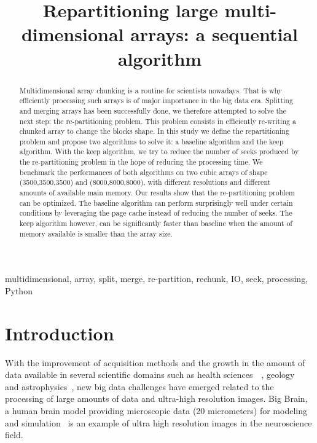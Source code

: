 \documentclass[conference]{IEEEtran}
\begin{document}
\title{Repartitioning large multi-dimensional arrays: a sequential algorithm}

\author{
}

\maketitle

\begin{abstract}

Multidimensional array chunking is a routine for scientists nowadays.
That is why efficiently processing such arrays is of major importance in the big data era.
Splitting and merging arrays has been successfully done, we therefore attempted
to solve the next step: the re-partitioning problem.
This problem consists in efficiently re-writing a chunked array to change the
blocks shape.
In this study we define the repartitioning problem and propose two algorithms to
solve it: a baseline algorithm and the keep algorithm.
With the keep algorithm, we try to reduce the number of seeks produced by the
re-partitioning problem in the hope of reducing the processing time.
We benchmark the performances of both algorithms on two cubic arrays of shape
(3500,3500,3500) and (8000,8000,8000), with different resolutions and different
amounts of available main memory.
Our results show that the re-partitioning problem can be optimized.
The baseline algorithm can perform surprisingly well under certain conditions
by leveraging the page cache instead of reducing the number of seeks. The keep
algorithm however, can be significantly faster than baseline when the amount of
memory available is smaller than the array size.

\end{abstract}

\begin{IEEEkeywords}
multidimensional, array, split, merge, re-partition, rechunk, IO, seek, processing, Python
\end{IEEEkeywords}

\section{Introduction}
With the improvement of acquisition methods and the growth in the amount of data
available in several scientific domains such as health
sciences~\cite{bigdata_health}~\cite{Amunts1472}, geology~\cite{big_data_geology}
and astrophysics~\cite{biguniverse}, new big data challenges have emerged related
to the processing of large amounts of data and ultra-high resolution
images. Big Brain, a human brain model providing microscopic data (20 micrometers) for
modeling and simulation~\cite{Amunts1472} is an example of ultra high resolution
images in the neuroscience field.
\end{document}
